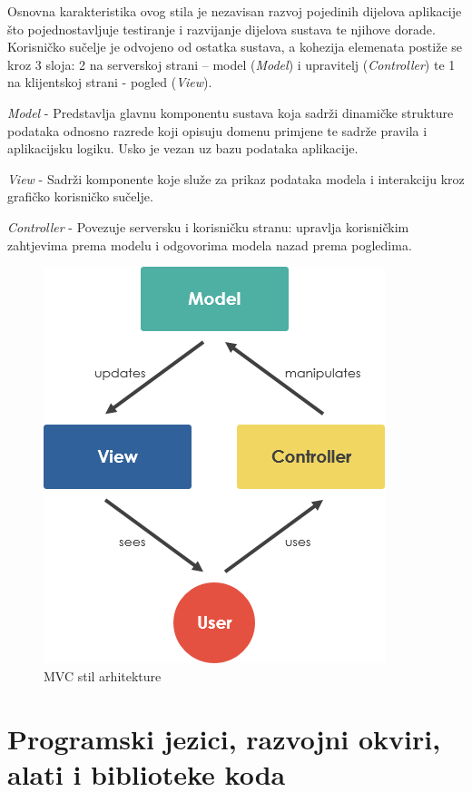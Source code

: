 		Osnovna	karakteristika ovog stila je	nezavisan razvoj pojedinih dijelova aplikacije što pojednostavljuje testiranje	i razvijanje dijelova sustava te	njihove	dorade. Korisničko sučelje je odvojeno od ostatka sustava, a kohezija elemenata postiže se kroz 3 sloja: 2 na serverskoj strani –  model (\textit{Model}) i upravitelj (\textit{Controller}) te 1 na klijentskoj strani - pogled (\textit{View}).

		\begin{packed_item}
			\item\textit{Model} - Predstavlja glavnu komponentu sustava koja sadrži dinamičke strukture podataka odnosno razrede koji opisuju domenu primjene te sadrže pravila i aplikacijsku logiku. Usko je vezan uz bazu podataka aplikacije.
			\item\textit{View} - Sadrži komponente koje služe za prikaz podataka modela i interakciju kroz grafičko korisničko sučelje.
			\item\textit{Controller} - Povezuje serversku i korisničku stranu: upravlja korisničkim zahtjevima prema modelu i odgovorima modela nazad prema pogledima.
		\end{packed_item}

		\begin{figure}[H]
			\includegraphics[scale=0.7]{slike/mvc-framework.PNG} 
			\centering
			\caption{MVC stil arhitekture}
			\label{mvc-framework}
		\end{figure}
	
		
		\section{Programski jezici, razvojni okviri, alati i biblioteke koda}
		
